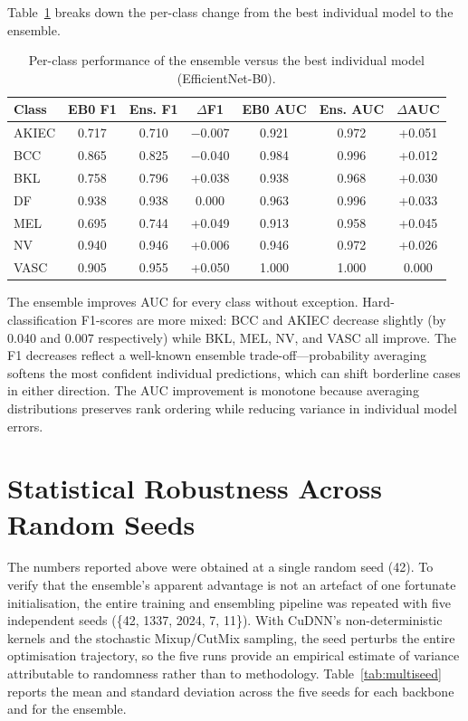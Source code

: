 Table~\ref{tab:ensemble_per_class} breaks down the per-class change from the best individual model to the ensemble.

\begin{table}[H]
\centering
\caption{Per-class performance of the ensemble versus the best individual model (EfficientNet-B0).}
\label{tab:ensemble_per_class}
\begin{tabular}{lcccccc}
\toprule
\textbf{Class} & \textbf{EB0 F1} & \textbf{Ens. F1} & \textbf{$\Delta$F1} & \textbf{EB0 AUC} & \textbf{Ens. AUC} & \textbf{$\Delta$AUC}\\
\midrule
AKIEC & 0.717 & 0.710 & $-$0.007 & 0.921 & 0.972 & +0.051 \\
BCC   & 0.865 & 0.825 & $-$0.040 & 0.984 & 0.996 & +0.012 \\
BKL   & 0.758 & 0.796 & +0.038  & 0.938 & 0.968 & +0.030 \\
DF    & 0.938 & 0.938 &  0.000  & 0.963 & 0.996 & +0.033 \\
MEL   & 0.695 & 0.744 & +0.049  & 0.913 & 0.958 & +0.045 \\
NV    & 0.940 & 0.946 & +0.006  & 0.946 & 0.972 & +0.026 \\
VASC  & 0.905 & 0.955 & +0.050  & 1.000 & 1.000 &  0.000 \\
\bottomrule
\end{tabular}
\end{table}

The ensemble improves AUC for every class without exception. Hard-classification F1-scores are more mixed: BCC and AKIEC decrease slightly (by 0.040 and 0.007 respectively) while BKL, MEL, NV, and VASC all improve. The F1 decreases reflect a well-known ensemble trade-off---probability averaging softens the most confident individual predictions, which can shift borderline cases in either direction. The AUC improvement is monotone because averaging distributions preserves rank ordering while reducing variance in individual model errors.

\section{Statistical Robustness Across Random Seeds}

The numbers reported above were obtained at a single random seed (42). To verify that the ensemble's apparent advantage is not an artefact of one fortunate initialisation, the entire training and ensembling pipeline was repeated with five independent seeds (\{42, 1337, 2024, 7, 11\}). With CuDNN's non-deterministic kernels and the stochastic Mixup/CutMix sampling, the seed perturbs the entire optimisation trajectory, so the five runs provide an empirical estimate of variance attributable to randomness rather than to methodology. Table~\ref{tab:multiseed} reports the mean and standard deviation across the five seeds for each backbone and for the ensemble.

